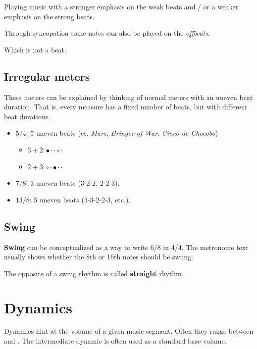 \begin{definition}[Syncopation]
    Playing music with a stronger emphasis on the weak beats and / or a weaker emphasis on the strong beats.
\end{definition}

Through syncopation some notes can also be played on the \emph{offbeats}.

\begin{definition}[Offbeat]
    Which is not a beat.
\end{definition}

\subsection{Irregular meters}
These meters can be explained by thinking of normal meters with an uneven beat duration. That is, every measure has a fixed number of beats, but with different beat durations.

\begin{itemize}
    \item $5/4$: 5 uneven beats (es. \emph{Mars, Bringer of War}, \emph{Cinco de Chocobo})
    \begin{itemize}
        \item $3+2: \bullet \cdot \cdot \circ \cdot$
        \item $2+3: \circ \cdot \bullet \cdot \cdot$
    \end{itemize}
    \item $7/8$: 3 uneven beats (3-2-2, 2-2-3).
    \item $13/8$: 5 uneven beats (3-3-2-2-3, etc.).
\end{itemize}

\subsection{Swing}
\textbf{Swing} can be conceptualized as a way to write 6/8 in 4/4. The metronome text usually shows whether the 8th or 16th notes should be swung.

The opposite of a swing rhythm is called \textbf{straight} rhythm.

\section{Dynamics}
Dynamics hint at the volume of a given music segment. Often they range between  and . The intermediate dynamic  is often used as a standard base volume.

